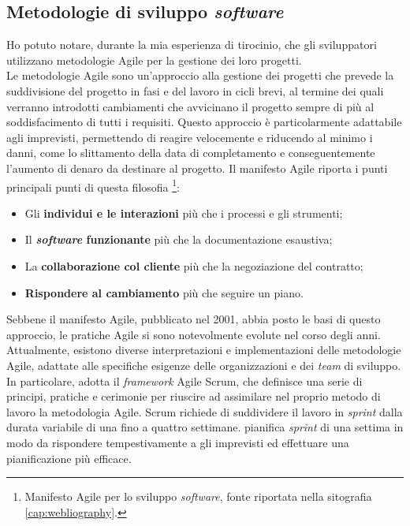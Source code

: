 \subsection{Metodologie di sviluppo \textit{software}}
Ho potuto notare, durante la mia esperienza di tirocinio, che gli sviluppatori utilizzano metodologie Agile per la gestione dei loro progetti.\\
Le metodologie Agile sono un'approccio alla gestione dei progetti che prevede la suddivisione del progetto 
in fasi e del lavoro in cicli brevi, al termine dei quali verranno introdotti cambiamenti che avvicinano il 
progetto sempre di più al soddisfacimento di tutti i requisiti. Questo approccio è particolarmente adattabile agli imprevisti, permettendo di reagire velocemente 
e riducendo al minimo i danni, come lo slittamento della data di completamento e conseguentemente l'aumento di denaro da destinare al progetto. 
Il manifesto Agile riporta i punti principali punti di questa filosofia
\footnote{Manifesto Agile per lo sviluppo \textit{software}, fonte riportata nella sitografia \ref{cap:webliography}.}:
\begin{itemize}
      \item Gli \textbf{individui e le interazioni} più che i processi e gli strumenti;
      \item Il \textbf{\textit{software} funzionante} più che la documentazione esaustiva;
      \item La \textbf{collaborazione col cliente} più che la negoziazione del contratto;
      \item \textbf{Rispondere al cambiamento} più che seguire un piano.
\end{itemize}
Sebbene il manifesto Agile, pubblicato nel 2001, abbia posto le basi di questo approccio, le pratiche Agile 
si sono notevolmente evolute nel corso degli anni. Attualmente, esistono diverse interpretazioni e 
implementazioni delle metodologie Agile, adattate alle specifiche esigenze delle organizzazioni e dei 
\textit{team} di sviluppo.\\
In particolare, {\company} adotta il \textit{framework} Agile Scrum, che definisce una 
serie di principi, pratiche e cerimonie per riuscire ad assimilare nel proprio metodo di lavoro la metodologia Agile. 
Scrum richiede di suddividere il lavoro in \textit{sprint} dalla durata variabile di una fino a quattro settimane. {\company} pianifica
\textit{sprint} di una settima in modo da rispondere tempestivamente a gli imprevisti ed effettuare una pianificazione più efficace.

